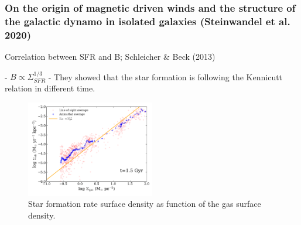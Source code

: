 \documentclass[10pt,aspectratio=169]{beamer}
\begin{document}
\begin{frame}
	\frametitle{On the origin of magnetic driven winds and the structure of the galactic dynamo in isolated galaxies (Steinwandel et al. 2020) }
	Correlation between SFR and B; Schleicher $\&$ Beck (2013)
	
	- $B\propto \Sigma_{SFR}^{1/3}$
	- They showed that the star formation is following the Kennicutt relation in different time.
	
	\begin{figure}
		\includegraphics[width=0.5\textwidth]{./images/sk_mag_075_new.pdf}
		\caption{Star formation rate surface density as function of the gas surface density.}
	\end{figure}
\end{frame}
\end{document}
